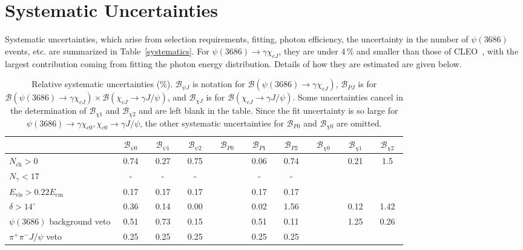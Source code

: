 \documentclass[aps,prd,twocolumn,showpacs,floatfix,byrevtex]{revtex4-1}
\newcommand\T{\rule{0pt}{2.6ex}}       %
\newcommand\B{\rule[-1.2ex]{0pt}{0pt}} %
\begin{document}
\section{Systematic Uncertainties}

Systematic uncertainties, which arise from selection requirements,
fitting, photon efficiency, the uncertainty in the number of
$\psi(3686)$ events, etc. are summarized in Table~\ref{systematics}.
For $\psi(3686) \to \gamma \chi_{cJ}$, they are under 4\,\% and
smaller than those of CLEO~\cite{cleo04}, with the largest
contribution coming from fitting the photon energy distribution.
Details of how they are estimated are given below.


\begin{table*}[tb]
\centering
\caption{Relative systematic uncertainties (\%).  $\mathcal{B}_{\psi J}$ is
  notation for $\mathcal{B}(\psi(3686) \to \gamma \chi_{cJ})$,
  $\mathcal{B}_{PJ}$ is for $\mathcal{B}(\psi(3686) \to \gamma
  \chi_{cJ})\times \mathcal{B}(\chi_{cJ} \to \gamma J/\psi)$, and
  $\mathcal{B}_{\chi J}$ is for $\mathcal{B}(\chi_{cJ} \to \gamma
  J/\psi)$. Some uncertainties cancel in the determination of
  $\mathcal{B}_{\chi1}$ and $\mathcal{B}_{\chi2}$ and are left blank in the table. Since the fit
  uncertainty is so large for $\psi(3686) \to \gamma \chi_{c0},
  \chi_{c0} \to \gamma J/\psi$, the other systematic uncertainties for
  $\mathcal{B}_{P0}$ and $\mathcal{B}_{\chi 0}$ are omitted.}
\vspace{0.05 in}
\begin{tabular}{l|ccc|ccc|ccc} \hline \hline
 \T & ~$\mathcal{B}_{\psi0}$~ &   ~$\mathcal{B}_{\psi1}$~  &
  ~$\mathcal{B}_{\psi2}$~  &   ~$\mathcal{B}_{P0}$~ &   ~$\mathcal{B}_{P1}$~ &
  ~$\mathcal{B}_{P2}$~ & ~$\mathcal{B}_{\chi0}$~ & ~$\mathcal{B}_{\chi1}$~ &   ~$\mathcal{B}_{\chi2}$~
 \B  \\  \hline
  \T $N_{\text{ch}} > 0$   & 0.74 & 0.27 & 0.75  &  & 0.06 & 0.74 &  & 0.21 & 1.5\\
  $N_{\gamma} < 17$ & - &- &- &  & - &- & & & \\
  $E_{\text{vis}} > 0.22E_{\text{cm}}$ & 0.17 &0.17 &0.17 &   &0.17 &0.17 & & & \\
  $\delta > 14^{\circ}$  & 0.36 & 0.14& 0.00&   & 0.02 &1.56 &  & 0.12&1.42\\
  $\psi(3686)$ background veto &0.51 &0.73 &0.15 &  & 0.51 &0.11 &  & 1.25 & 0.26\\
  $\pi^+ \pi^- J/\psi$ veto  & 0.25 & 0.25 & 0.25 &  & 0.25 & 0.25 & &  &\\

\end{tabular}
\end{table*}
\end{document}
